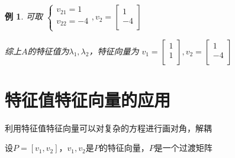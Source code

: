 \documentclass[12pt, a4paper, oneside]{ctexbook}
\newtheorem{example}[theorem]{例}
\begin{document}
\begin{example}
    可取
    $
    \begin{cases}
        v_{21}=1 \\
        v_{22}=-4 \\
    \end{cases},
    v_2=
    \left[
        \begin{matrix}
            1 \\ -4 \\
        \end{matrix}
    \right]
    $

    综上$A$的特征值为$\lambda_1,\lambda_2$，特征向量为
    $
    v_1=
    \left[
        \begin{matrix}
            1 \\ 1 \\
        \end{matrix}
    \right],
    v_2=
    \left[
        \begin{matrix}
            1 \\ -4 \\
        \end{matrix}
    \right]
    $

\end{example}


\section{特征值特征向量的应用}

利用特征值特征向量可以对复杂的方程进行画对角，解耦

设$P=\left[v_1,v_2\right]$，$v_1,v_2$是$P$的特征向量，$P$是一个过渡矩阵
\end{document}
